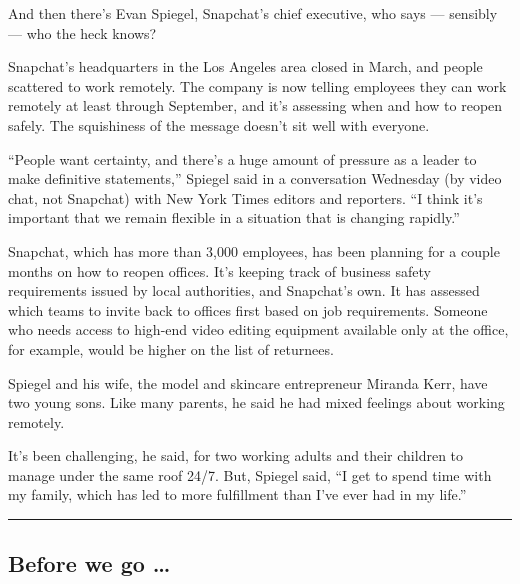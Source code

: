And then there's Evan Spiegel, Snapchat's chief executive, who says ---
sensibly --- who the heck knows?

Snapchat's headquarters in the Los Angeles area closed in March, and
people scattered to work remotely. The company is now telling employees
they can work remotely at least through September, and it's assessing
when and how to reopen safely. The squishiness of the message doesn't
sit well with everyone.

``People want certainty, and there's a huge amount of pressure as a
leader to make definitive statements,'' Spiegel said in a conversation
Wednesday (by video chat, not Snapchat) with New York Times editors and
reporters. ``I think it's important that we remain flexible in a
situation that is changing rapidly.''

Snapchat, which has more than 3,000 employees, has been planning for a
couple months on how to reopen offices. It's keeping track of business
safety requirements issued by local authorities, and Snapchat's own. It
has assessed which teams to invite back to offices first based on job
requirements. Someone who needs access to high-end video editing
equipment available only at the office, for example, would be higher on
the list of returnees.

Spiegel and his wife, the model and skincare entrepreneur Miranda Kerr,
have two young sons. Like many parents, he said he had mixed feelings
about working remotely.

It's been challenging, he said, for two working adults and their
children to manage under the same roof 24/7. But, Spiegel said, ``I get
to spend time with my family, which has led to more fulfillment than
I've ever had in my life.''

\begin{center}\rule{0.5\linewidth}{\linethickness}\end{center}

\hypertarget{before-we-go-}{%
\subsection{Before we go \ldots{}}\label{before-we-go-}}

